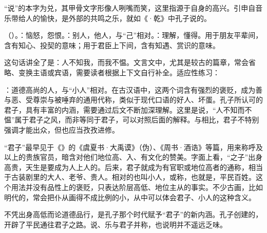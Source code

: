 {“说”的本字为兑，其甲骨文字形像人咧嘴而笑，这里指源于自身的高兴。引申自音乐带给人的愉快，是外部的共鸣之乐，就如《·乾》中孔子说的。

\item {}（）。：恼怒，怨恨。：别人，他人，与“己”相对。：理解，懂得。用于朋友平辈间，含有知心、投契的意味；用于君臣上下间，含有知遇、赏识的意味。

这句话讲全了是：人不知我，而我不愠。文言文中，尤其是较古的篇章，常会省略、变换主语或宾语，需要读者根据上下文自行补全。适应性练习：   

\item {}：道德高尚的人，与“小人”相对。在古汉语中，这两个词含有强烈的褒贬，成为善与恶、受尊崇与被唾弃的通用代称，类似于现代口语的好人、坏蛋。孔子所认可的君子，具有丰富的内涵，需要通过后文不断加深理解。这里是说，“人不知而不愠”属于君子之风，而非等同于君子，可以对照后面的解释。与相比，君子不特别强调才能出众，但也应当孜孜进修。

“君子”最早见于《》的《虞夏书·大禹谟》（伪）、《周书·酒诰》等篇，用来称呼及以上的贵族官员，暗含对他们地位高、入、有文化的赞美。字面上看，“之子”出身高贵，天生是要成为人上人的。后来，君子就成为有官职或地位高者的通称，相当于古装剧里的大人、老爷、贵人。相对的也叫小人，或称，也就是，平民百姓。这个用法并没有品性上的褒贬，只表达阶层高低、地位主从的事实。不少古画，比如明代的，常会把仆从画得不成比例的小，从中可以体会君子、小人的这种含义。

不凭出身高低而论道德品行，是孔子那个时代赋予“君子”的新内涵。孔子创建的，开辟了平民通往君子之路。说、乐与君子并称，也说明并不遥远乏味。
}

